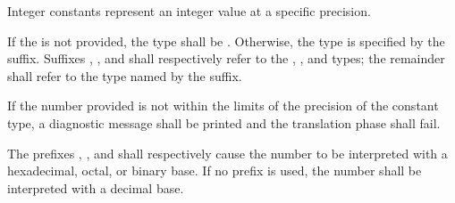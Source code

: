 
Integer constants represent an integer value at a specific precision.

\specsubitem
If the  is not provided, the type shall be
.  Otherwise, the type is specified by the suffix. Suffixes
, ,  and  shall respectively refer to the
, , and  types; the remainder shall
refer to the type named by the suffix.

\specsubitem
If the number provided is not within the limits of the precision of the
constant type, a diagnostic message shall be printed and the translation phase
shall fail.

\specsubitem
The prefixes , , and  shall respectively
cause the number to be interpreted with a hexadecimal, octal, or binary base.
If no prefix is used, the number shall be interpreted with a decimal base.




























